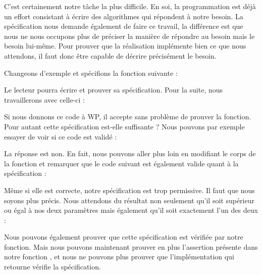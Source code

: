 

C'est certainement notre tâche la plus difficile. En soi, la programmation est
déjà un effort consistant à écrire des algorithmes qui répondent à notre 
besoin. La spécification nous demande également de faire ce travail, la 
différence est que nous ne nous occupons plus de préciser la manière de répondre
au besoin mais le besoin lui-même. Pour prouver que la réalisation implémente 
bien ce que nous attendons, il faut donc être capable de décrire précisément le
besoin.



Changeons d'exemple et spécifions la fonction suivante :






Le lecteur pourra écrire et prouver sa spécification. Pour la suite, nous 
travaillerons avec celle-ci :






Si nous donnons ce code à WP, il accepte sans problème de prouver la fonction. 
Pour autant cette spécification est-elle suffisante ? Nous pouvons par exemple 
essayer de voir si ce code est validé :






La réponse est non. En fait, nous pouvons aller plus loin en modifiant le corps 
de la fonction  et remarquer que le code suivant est également valide 
quant à la spécification :







Même si elle est correcte, notre spécification est trop permissive. Il faut que nous
soyons plus précis.
Nous attendons du résultat non seulement qu'il soit supérieur ou égal à nos 
deux paramètres mais également qu'il soit exactement l'un des deux :





Nous pouvons également prouver que cette spécification est vérifiée par notre
fonction. Mais nous pouvons maintenant prouver en plus l'assertion présente dans
notre fonction , et nous ne pouvons plus prouver que
l'implémentation qui retourne  vérifie la spécification.



